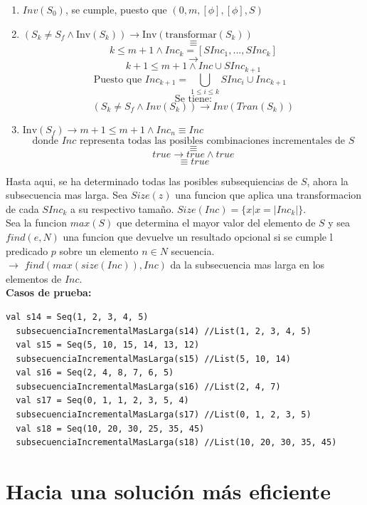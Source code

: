\documentclass[12pt, a4paper]{article}
\begin{document}
\begin{enumerate}
  \item $Inv(S_0)$, se cumple, puesto que $(0,m,[\phi],[\phi],S)$ 
  \item \( (S_k \neq S_f \land \text{Inv}(S_k)) \rightarrow \text{Inv}(\text{transformar}(S_k)) \)
  \[\equiv\]
  \[k \leq m+1 \land Inc_k  =[SInc_1,...,SInc_k]\] 
  \[\rightarrow   \]
  \[k+1\leq m+1 \land Inc \cup SInc_{k+1}\]
  \[ \text{Puesto que $Inc_{k+1}=\bigcup_{1\leq i \leq k } SInc_i \cup Inc_{k+1}$ }\]
  \[ \text{Se tiene:}\]
  \[ (S_k \neq S_f \land Inv(S_k)) \rightarrow Inv(Tran(S_k))\]
  \item \( \text{Inv}(S_f) \rightarrow m+1 \leq m+1 \land Inc_n \equiv Inc \)
  \[\text{donde $Inc$ representa todas las posibles combinaciones incrementales de }S\]
  \[ \equiv\]
  \[ true  \rightarrow true \land true\] 
  \[\equiv true\]
\end{enumerate}
Hasta aqui, se ha determinado todas las posibles subsequiencias de $S$, ahora la subsecuencia mas larga. Sea $Size(z)$ una funcion que aplica una transformacion de cada $SInc_k$ a su respectivo tamaño.
$Size(Inc)=\{x|x = |Inc_k|\}$. \\
Sea la funcion $max(S)$ que determina el mayor valor del elemento de $S$ y sea $find(e,N)$ una funcion que devuelve un resultado opcional si se cumple l predicado $p$ sobre un elemento $n \in N$ secuencia.
\\ 
$\rightarrow$ $find(max(size(Inc)),Inc)$ da la subsecuencia mas larga en los elementos de $Inc$. \\
\newpage
\textbf{Casos de prueba: \\}
\begin{lstlisting}[caption=Casos de prueba para la función subsecuenciaIncrementalMasLarga, label=lst:scala_code]
  val s14 = Seq(1, 2, 3, 4, 5)
  subsecuenciaIncrementalMasLarga(s14) //List(1, 2, 3, 4, 5)
  val s15 = Seq(5, 10, 15, 14, 13, 12)
  subsecuenciaIncrementalMasLarga(s15) //List(5, 10, 14)
  val s16 = Seq(2, 4, 8, 7, 6, 5)
  subsecuenciaIncrementalMasLarga(s16) //List(2, 4, 7)
  val s17 = Seq(0, 1, 1, 2, 3, 5, 4)
  subsecuenciaIncrementalMasLarga(s17) //List(0, 1, 2, 3, 5)
  val s18 = Seq(10, 20, 30, 25, 35, 45)
  subsecuenciaIncrementalMasLarga(s18) //List(10, 20, 30, 35, 45)
\end{lstlisting}

\section{Hacia una solución más eficiente}
\end{document}
